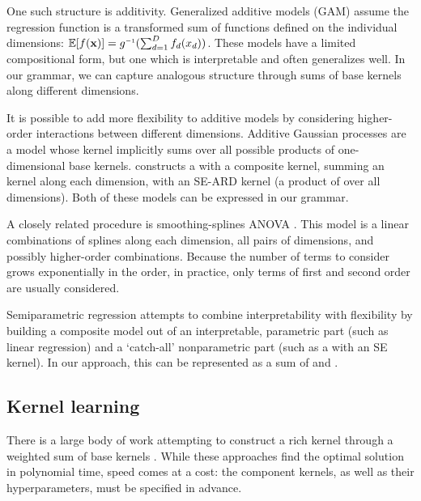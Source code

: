 One such structure is additivity.
Generalized additive models (GAM) assume the regression function is a transformed sum of functions defined on the individual dimensions: $\expect[f(\vx)] = g\inv(\sum_{d=1}^D f_d(x_d))$.
These models have a limited compositional form, but one which is interpretable and often generalizes well.
In our grammar, we can capture analogous structure through sums of base kernels along different dimensions.

It is possible to add more flexibility to additive models by considering higher-order interactions between different dimensions. 
Additive Gaussian processes \cite{duvenaud2011additive11} are a \gp{} model whose kernel implicitly sums over all possible products of one-dimensional base kernels.  
\citet{plate1999accuracy} constructs a \gp{} with a composite kernel, summing an \kSE{} kernel along each dimension, with an SE-ARD kernel (\ie a product of \kSE{} over all dimensions).
Both of these models can be expressed in our grammar.

A closely related procedure is smoothing-splines ANOVA \cite{wahba1990spline, gu2002smoothing}.
This model is a linear combinations of splines along each dimension, all pairs of dimensions, and possibly higher-order combinations.
Because the number of terms to consider grows exponentially in the order, in practice, only terms of first and second order are usually considered.

Semiparametric regression \citep[e.g.][]{ruppert2003semiparametric} attempts to combine interpretability with flexibility by building  a composite model out of an interpretable, parametric part (such as linear regression) and a `catch-all' nonparametric part (such as a \gp{} with an SE kernel).
In our approach, this can be represented as a sum of \kSE{} and \kLin{}.

\subsection{Kernel learning}
There is a large body of work attempting to construct a rich kernel through a weighted sum of base kernels \citep[e.g.][]{christoudias2009bayesian, Bach_HKL}.
While these approaches find the optimal solution in polynomial time, speed comes at a cost: the component kernels, as well as their hyperparameters, must be specified in advance.

